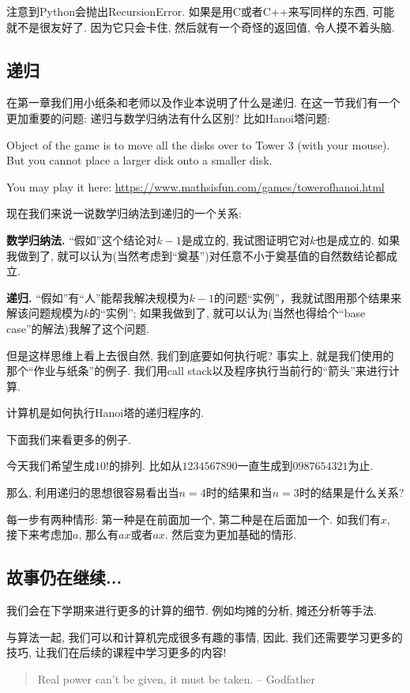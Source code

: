 注意到Python会抛出RecursionError. 如果是用C或者C++来写同样的东西, 可能就不是很友好了. 因为它只会卡住, 然后就有一个奇怪的返回值, 令人摸不着头脑. 

\subsection*{递归}

在第一章我们用小纸条和老师以及作业本说明了什么是递归. 在这一节我们有一个更加重要的问题: 递归与数学归纳法有什么区别? 比如Hanoi塔问题: 


\begin{prob}[Hanoi塔问题]
	Object of the game is to move all the disks over to Tower 3 (with your mouse). But you cannot place a larger disk onto a smaller disk.
	
	You may play it here: \url{https://www.mathsisfun.com/games/towerofhanoi.html}
\end{prob}

现在我们来说一说数学归纳法到递归的一个关系: 

\textbf{数学归纳法. } ``假如''这个结论对$k-1$是成立的, 我试图证明它对$k$也是成立的. 
如果我做到了, 就可以认为(当然考虑到``奠基'')对任意不小于奠基值的自然数结论都成立. 

\textbf{递归. }``假如''有``人''能帮我解决规模为$k-1$的问题``实例''，我就试图用那个结果来解该问题规模为$k$的``实例''; 如果我做到了, 就可以认为(当然也得给个“base case”的解法)我解了这个问题. 

但是这样思维上看上去很自然, 我们到底要如何执行呢? 事实上, 就是我们使用的那个``作业与纸条''的例子. 我们用call stack以及程序执行当前行的``箭头''来进行计算. 

\begin{example}
	计算机是如何执行Hanoi塔的递归程序的. 
\end{example}

下面我们来看更多的例子. 

 今天我们希望生成$10!$的排列. 比如从$1234567890$一直生成到$0987654321$为止. 

那么, 利用递归的思想很容易看出当$n=4$时的结果和当$n=3$时的结果是什么关系? 

每一步有两种情形: 第一种是在前面加一个, 第二种是在后面加一个. 如我们有$x$, 接下来考虑加$a$, 那么有$ax$或者$ax$. 然后变为更加基础的情形. 

\subsection*{故事仍在继续...}

我们会在下学期来进行更多的计算的细节. 例如均摊的分析, 摊还分析等手法. 

与算法一起, 我们可以和计算机完成很多有趣的事情, 因此, 我们还需要学习更多的技巧, 让我们在后续的课程中学习更多的内容! 

\vspace{2cm}

\begin{quote}
	Real power can't be given, it must be taken.  \hfill -- Godfather
\end{quote}


















